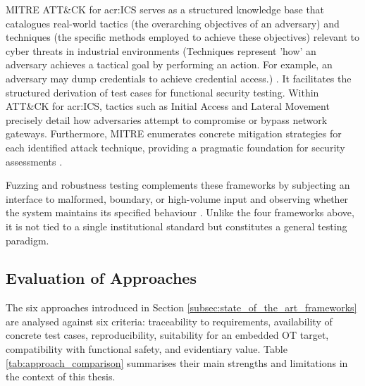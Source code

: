 MITRE ATT\&CK for \gls{acr:ICS} serves as a structured knowledge base that catalogues real-world tactics (the overarching objectives of an adversary) and techniques (the specific methods employed to achieve these objectives) relevant to cyber threats in industrial environments (Techniques represent 'how' an adversary achieves a tactical goal by performing an action. For example, an adversary may dump credentials to achieve credential access.) \cite{mitre_attack_ics}. It facilitates the structured derivation of test cases for functional security testing. Within ATT\&CK for \gls{acr:ICS}, tactics such as Initial Access and Lateral Movement precisely detail how adversaries attempt to compromise or bypass network gateways. Furthermore, MITRE enumerates concrete mitigation strategies for each identified attack technique, providing a pragmatic foundation for security assessments \cite{mitre_attack_ics_tactics}. 

Fuzzing and robustness testing complements these frameworks by subjecting an interface to malformed, boundary, or high-volume input and observing whether the system maintains its specified behaviour \cite[p. 29]{richier2011security}. Unlike the four frameworks above, it is not tied to a single institutional standard but constitutes a general testing paradigm. 

\subsection{Evaluation of Approaches} 
\label{subsec:approach_evaluation} 

The six approaches introduced in Section \ref{subsec:state_of_the_art_frameworks} are analysed against six criteria: traceability to requirements, availability of concrete test cases, reproducibility, suitability for an embedded OT target, compatibility with functional safety, and evidentiary value. Table \ref{tab:approach_comparison} summarises their main strengths and limitations in the context of this thesis. 

